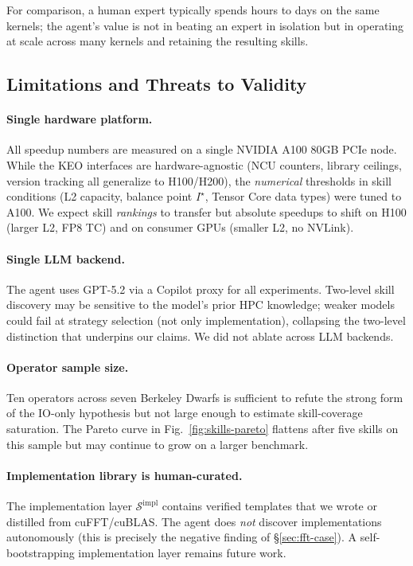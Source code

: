 \documentclass[sigconf,nonacm]{acmart}
\begin{document}
For comparison, a human expert typically spends hours to days on
the same kernels; the agent's value is not in beating an expert in
isolation but in operating at scale across many kernels and
retaining the resulting skills.

\subsection{Limitations and Threats to Validity}

\paragraph{Single hardware platform.}
All speedup numbers are measured on a single NVIDIA A100 80GB
PCIe node. While the KEO interfaces are hardware-agnostic (NCU
counters, library ceilings, version tracking all generalize to
H100/H200), the \emph{numerical} thresholds in skill conditions
(L2 capacity, balance point $I^\star$, Tensor Core data types)
were tuned to A100. We expect skill \emph{rankings} to transfer
but absolute speedups to shift on H100 (larger L2, FP8 TC) and on
consumer GPUs (smaller L2, no NVLink).

\paragraph{Single LLM backend.}
The agent uses GPT-5.2 via a Copilot proxy for all experiments.
Two-level skill discovery may be sensitive to the model's prior
HPC knowledge; weaker models could fail at strategy selection
(not only implementation), collapsing the two-level distinction
that underpins our claims. We did not ablate across LLM
backends.

\paragraph{Operator sample size.}
Ten operators across seven Berkeley Dwarfs is sufficient to refute
the strong form of the IO-only hypothesis but not large enough to
estimate skill-coverage saturation. The Pareto curve in
Fig.~\ref{fig:skills-pareto} flattens after five skills on this
sample but may continue to grow on a larger benchmark.

\paragraph{Implementation library is human-curated.}
The implementation layer $\mathcal{S}^{\text{impl}}$ contains
verified templates that we wrote or distilled from cuFFT/cuBLAS.
The agent does \emph{not} discover implementations autonomously
(this is precisely the negative finding of \S\ref{sec:fft-case}).
A self-bootstrapping implementation layer remains future work.
\end{document}
